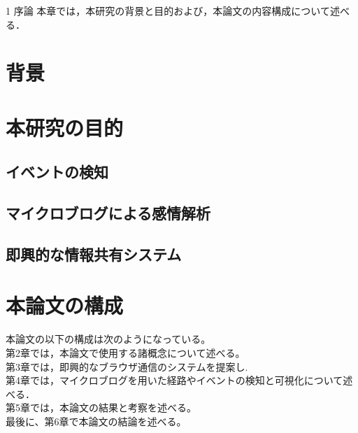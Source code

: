 \chapterhead
{1}
{序論}
{本章では，本研究の背景と目的および，本論文の内容構成について述べる．}

\section{背景}

\newpage

\section{本研究の目的}
\subsection{イベントの検知}

\newpage

\subsection{マイクロブログによる感情解析}

\newpage

\subsection{即興的な情報共有システム}

\section{本論文の構成}
本論文の以下の構成は次のようになっている。\\
第2章では，本論文で使用する諸概念について述べる。\\
第3章では，即興的なブラウザ通信のシステムを提案し. \\
第4章では，マイクロブログを用いた経路やイベントの検知と可視化について述べる．\\
第5章では，本論文の結果と考察を述べる。\\
最後に、第6章で本論文の結論を述べる。\\
